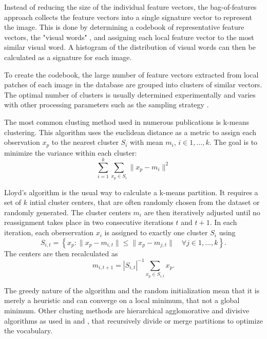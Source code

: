Instead of reducing the size of the individual feature vectors, the
bag-of-features approach collects the feature vectors into a single signature
vector to represent the image. This is done by determining a codebook of
representative feature vectors, the "visual words" \autocite{sivic_video_2003},
and assigning each local feature vector to the most similar visual word. A
histogram of the distribution of visual words can then be calculated as a
signature for each image.

To create the codebook, the large number of feature vectors extracted from
local patches of each image in the database are grouped into clusters of
similar vectors. The optimal number of clusters is usually determined
experimentally and varies with other processing parameters such as the sampling
strategy \autocite{nowak_sampling_2006} \autocite{yang_evaluating_2007}.


The most common clusting method used in numerous publications
\autocite{zhu_theory_2002} \autocite{sivic_video_2003}
\autocite{csurka_visual_2004} \autocite{fergus_learning_2005}
\autocite{winn_object_2005} is k-means clustering. This algorithm uses the
euclidean distance as a metric to assign each observation $x_p$ to the nearest
cluster $S_i$ with mean $m_i$, $i \in 1, \dots, k$. The goal is to minimize
the variance within each cluster:
\begin{equation*}
    \sum_{i=1}^k \sum_{x_p \in S_i} \| x_p - m_i \|^2
\end{equation*}

Lloyd's algorithm is the usual way to calculate a k-means partition. It
requires a set of $k$ intial cluster centers, that are often randomly chosen
from the dataset or randomly generated. The cluster centers $m_i$ are then
iteratively adjusted until no reassignment takes place in two consecutive
iterations $t$ and $t+1$. In each iteration, each oberservation $x_i$ is
assigned to exactly one cluster $S_i$ using
\begin{equation*}
    S_{i, t} = \left\{ x_p : \| x_p - m_{i, t} \| \leq \| x_p - m_{j, t} \| \quad \forall j \in 1, \dots, k \right\}.
\end{equation*}
The centers are then recalculated as
\begin{equation*}
    m_{i, t+1} = |S_{i, t}|^{-1} \sum_{x_p \in S_{i, t}} x_p.
\end{equation*}

The greedy nature of the algorithm and the random initialization mean that it
is merely a heuristic and can converge on a local minimum, that not a global
minimum.
Other clusting methods are hierarchical agglomorative and divisive algorithms as
used in \autocite{nister_scalable_2006} and \autocite {philbin_object_2007},
that recursively divide or merge partitions to optimize the vocabulary.

